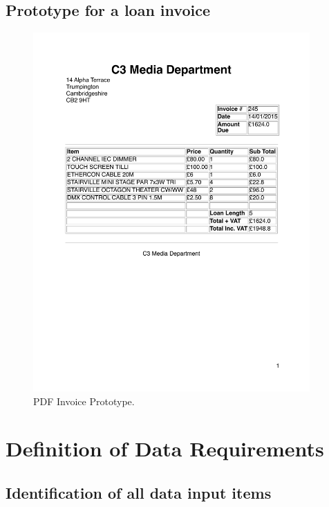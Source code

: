 \subsection{\textbf{Prototype for a loan invoice}}

\begin{figure}[H]
    \centerline{\includegraphics[width=400px]{./Design/Prototyping/invoice_preview.pdf}}
    \caption{PDF Invoice Prototype.} \label{fig:relationship_diagram}
\end{figure}

\section{Definition of Data Requirements}

\subsection{Identification of all data input items}

